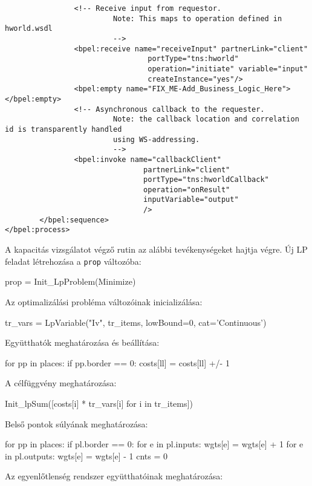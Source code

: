 \begin{verbatim}
				<!-- Receive input from requestor. 
						 Note: This maps to operation defined in hworld.wsdl 
						 -->
				<bpel:receive name="receiveInput" partnerLink="client"
								 portType="tns:hworld"
								 operation="initiate" variable="input"
								 createInstance="yes"/>
				<bpel:empty name="FIX_ME-Add_Business_Logic_Here"></bpel:empty>
				<!-- Asynchronous callback to the requester.
						 Note: the callback location and correlation id is transparently handled 
						 using WS-addressing.
						 -->
				<bpel:invoke name="callbackClient" 
								partnerLink="client"
								portType="tns:hworldCallback"
								operation="onResult" 
								inputVariable="output"
								/>
		</bpel:sequence>
</bpel:process>
\end{verbatim}
A kapacitás vizsgálatot végző rutin az alábbi tevékenységeket hajtja végre.
Új LP feladat létrehozása a \texttt{prop} változóba:
\begin{python}
prop = Init_LpProblem(Minimize)
\end{python}
Az optimalizálási probléma változóinak inicializálása:
\begin{python}
tr_vars = LpVariable("Iv", tr_items, lowBound=0, cat='Continuous')
\end{python}
Együtthatók meghatározása és beállítása:
\begin{python}
for pp in places:
	if pp.border == 0:
		costs[ll] = costs[ll] +/- 1
\end{python}
\newpage
A célfüggvény meghatározása:
\begin{python}
Init_lpSum([costs[i] * tr_vars[i] for i in tr_items])
\end{python}
Belső pontok súlyának meghatározása:
\begin{python}
for pp in places:
    if pl.border == 0:
        for e in pl.inputs:
            wgts[e] = wgts[e] + 1
        for e in pl.outputs:
            wgts[e] = wgts[e] - 1
        cnts = 0
\end{python}
Az egyenlőtlenség rendszer együtthatóinak meghatározása:
